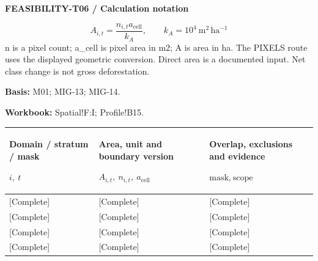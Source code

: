 \ProjectMapBox
{}
\par\begingroup\sffamily\fontsize{8}{10}\selectfont\color{NEBGreen}\setlength{\parskip}{2pt}\setlength{\abovedisplayskip}{4pt}\setlength{\belowdisplayskip}{4pt}\setlength{\abovedisplayshortskip}{2pt}\setlength{\belowdisplayshortskip}{3pt}
\textbf{FEASIBILITY-T06 / Calculation notation}\par
{\fontsize{9}{11}\selectfont\[ A_{i,t}=\frac{n_{i,t}a_{\mathrm{cell}}}{k_A},\qquad k_A=10^4\ \mathrm{m^2\,ha^{-1}} \]}
n is a pixel count; a\_cell is pixel area in m2; A is area in ha. The PIXELS route uses the displayed geometric conversion. Direct area is a documented input. Net class change is not gross deforestation.\par
\textbf{Basis:} M01; MIG-13; MIG-14.\par
\textbf{Workbook:} Spatial!F:I; Profile!B15.\par\endgroup
{\sffamily\fontsize{8.3}{10.3}\selectfont\begin{longtable}{@{}P{51.14mm} P{54.44mm} P{59.39mm}@{}}
\toprule
\textbf{Domain / stratum / mask}\par {\normalfont\fontsize{8.2}{10}\selectfont $i,\ t$} & \textbf{Area, unit and boundary version}\par {\normalfont\fontsize{8.2}{10}\selectfont $A_{i,t},\ n_{i,t},\ a_{\mathrm{cell}}$} & \textbf{Overlap, exclusions and evidence}\par {\normalfont\fontsize{8.2}{10}\selectfont $\text{mask},\ \text{scope}$}\\\midrule\endhead
\rule{0pt}{7.7mm}[Complete] & [Complete] & [Complete]\\\hline
\rule{0pt}{7.7mm}[Complete] & [Complete] & [Complete]\\\hline
\rule{0pt}{7.7mm}[Complete] & [Complete] & [Complete]\\\hline
\rule{0pt}{7.7mm}[Complete] & [Complete] & [Complete]\\\hline
\end{longtable}}
